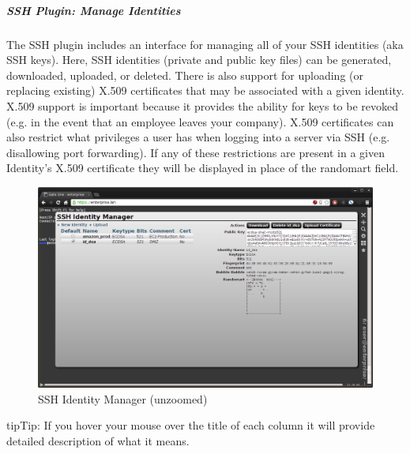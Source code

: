 \documentclass[letterpaper,10pt,openany]{sphinxmanual}
\begin{document}
\subparagraph{SSH Plugin: Manage Identities}
\label{Applications/terminal/userguide:ssh-plugin-manage-identities}
The SSH plugin includes an interface for managing all of your SSH identities (aka SSH keys).  Here, SSH identities (private and public key files) can be generated, downloaded, uploaded, or deleted.  There is also support for uploading (or replacing existing) X.509 certificates that may be associated with a given identity.  X.509 support is important because it provides the ability for keys to be revoked (e.g. in the event that an employee leaves your company).  X.509 certificates can also restrict what privileges a user has when logging into a server via SSH (e.g. disallowing port forwarding).  If any of these restrictions are present in a given Identity's X.509 certificate they will be displayed in place of the randomart field.
\begin{figure}[htbp]
\centering
\capstart

\includegraphics{gateone_ssh_identity_manager.png}
\caption{SSH Identity Manager (unzoomed)}\end{figure}

\begin{notice}{tip}{Tip:}
If you hover your mouse over the title of each column it will provide detailed description of what it means.
\end{notice}
\end{document}
